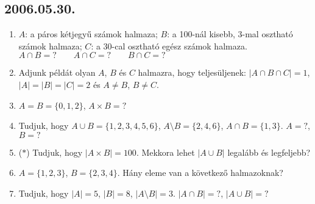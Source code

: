 \subsection*{2006.05.30.}
\begin{enumerate}
\item $A$: a páros kétjegyű számok halmaza; $B$: a 100-nál kisebb, 3-mal osztható számok halmaza; $C$: a 30-cal osztható egész számok halmaza.
$
A\cap B=?\qquad
A\cap C=?\qquad
B\cap C=?
$
\item Adjunk példát olyan $A$, $B$ és $C$ halmazra, hogy teljesüljenek:
$|A\cap B \cap C|=1$, $|A|=|B|=|C|=2$ és $A\ne B$, $B\ne C$.
\item $A=B=\{0,1,2\}$, $A\times B=?$
\item Tudjuk, hogy $A\cup B=\{1,2,3,4,5,6\}$, $A\setminus B=\{2,4,6\}$, 
$A\cap B=\{1,3\}$. $A=?$, $B=?$
\item ($*$) Tudjuk, hogy $|A \times B|=100$. Mekkora lehet $|A\cup B|$ legalább és legfeljebb?
\item $A=\{1,2,3\}$, $B=\{2,3,4\}$. Hány eleme van a következő halmazoknak?
\item Tudjuk, hogy $|A|=5$, $|B|=8$, $|A\setminus B|=3$. $|A\cap B|=?$, $|A\cup B|=?$
\end{enumerate}

